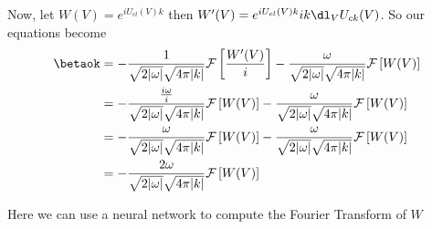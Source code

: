 \noindent Now, let $W(V) = e^{iU_{cl}(V)k}$ then $W'(V) = e^{iU_{cl}(V)k} ik \dl_VU_{ck}(V)$. So our equations become
\begin{eqnarray*}
    \betaok &= -\frac{1}{\sqrt{2|\omega|}\sqrt{4\pi |k|}} \mathcal{F}\left[ \frac{W'(V)}{i} \right] - \frac{\omega}{\sqrt{2|\omega|}\sqrt{4\pi |k|}} \mathcal{F}\left[ W(V) \right] \\
    &= -\frac{\frac{i\omega}{i}}{\sqrt{2|\omega|}\sqrt{4\pi |k|}} \mathcal{F}\left[ W(V) \right] - \frac{\omega}{\sqrt{2|\omega|}\sqrt{4\pi |k|}} \mathcal{F}\left[ W(V) \right] \\
    &= -\frac{\omega}{\sqrt{2|\omega|}\sqrt{4\pi |k|}} \mathcal{F}\left[ W(V) \right] - \frac{\omega}{\sqrt{2|\omega|}\sqrt{4\pi |k|}} \mathcal{F}\left[ W(V) \right] \\
    &= -\frac{2\omega}{\sqrt{2|\omega|}\sqrt{4\pi |k|}} \mathcal{F}\left[ W(V) \right]
\end{eqnarray*} 

\noindent Here we can use a neural network to compute the Fourier Transform of $W$